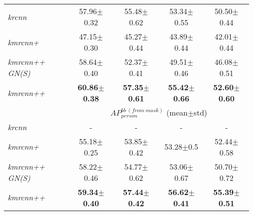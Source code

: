 \begin{table}[t!]
{\begin{tabular}{l|cccc}
			\hline
			\emph{krcnn}            & 57.96$\pm$0.32                                                                                        & 55.48$\pm$0.62          & 53.34$\pm$0.55          & 50.50$\pm$0.44  \Tstrut                     \\
			\emph{kmrcnn+}          & 47.15$\pm$0.30                                                                                        & 45.27$\pm$0.44          & 43.89$\pm$0.44          & 42.01$\pm$0.44                      \Tstrut \\
			\emph{kmrcnn++ GN(S)}   & 58.64$\pm$0.40                                                                                        & 52.37$\pm$0.41          & 49.51$\pm$0.46          & 46.08$\pm$0.51 \Tstrut                      \\\hline
			\emph{kmrcnn++}         & \textbf{60.86$\pm$0.38}                                                                               & \textbf{57.35$\pm$0.61} & \textbf{55.42$\pm$0.66} & \textbf{52.60$\pm$0.60} \Tstrut             \\
			\hline
			                        & \multicolumn{4}{c}{$\mathit{AP_{person}^{bb\ (from\ mask)}}$ (mean$\pm$std)} \Tstrut \Bstrut                                                                                                   \\
			\hline
			\emph{krcnn}            & -                                                                                                     & -                       & -                       & - \Tstrut                                   \\
			\emph{kmrcnn+}          & 55.18$\pm$0.25                                                                                        & 53.85$\pm$0.42          & 53.28$\pm$0.5           & 52.44$\pm$0.58 \Tstrut                      \\
			\emph{kmrcnn++ GN(S)}   & 58.22$\pm$0.46                                                                                        & 54.77$\pm$0.62          & 53.06$\pm$0.67          & 50.70$\pm$0.72 \Tstrut                      \\\hline
			\emph{kmrcnn++}         & \textbf{59.34$\pm$0.40}                                                                               & \textbf{57.44$\pm$0.42} & \textbf{56.62$\pm$0.41} & \textbf{55.39$\pm$0.51} \Tstrut             \\
			\hline
		\end{tabular}
	}
	\label{table:splitgn-design}
	\vspace{-1mm}
\end{table}
